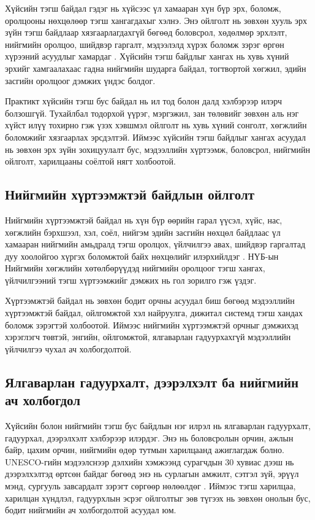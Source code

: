 Хүйсийн тэгш байдал гэдэг нь хүйсээс үл хамааран хүн бүр эрх, боломж, оролцооны нөхцөлөөр тэгш хангагдахыг хэлнэ. Энэ ойлголт нь зөвхөн хууль эрх зүйн тэгш байдлаар хязгаарлагдахгүй бөгөөд боловсрол, хөдөлмөр эрхлэлт, нийгмийн оролцоо, шийдвэр гаргалт, мэдээлэлд хүрэх боломж зэрэг өргөн хүрээний асуудлыг хамардаг \cite{gender_equality_general}. Хүйсийн тэгш байдлыг хангах нь хувь хүний эрхийг хамгаалахаас гадна нийгмийн шударга байдал, тогтвортой хөгжил, эдийн засгийн оролцоог дэмжих үндэс болдог.

Практикт хүйсийн тэгш бус байдал нь ил тод болон далд хэлбэрээр илэрч болзошгүй. Тухайлбал тодорхой үүрэг, мэргэжил, зан төлөвийг зөвхөн аль нэг хүйст илүү тохирно гэж үзэх хэвшмэл ойлголт нь хувь хүний сонголт, хөгжлийн боломжийг хязгаарлах эрсдэлтэй. Иймээс хүйсийн тэгш байдлыг хангах асуудал нь зөвхөн эрх зүйн зохицуулалт бус, мэдээллийн хүртээмж, боловсрол, нийгмийн ойлголт, харилцааны соёлтой нягт холбоотой.

\subsection{Нийгмийн хүртээмжтэй байдлын ойлголт}

Нийгмийн хүртээмжтэй байдал нь хүн бүр өөрийн гарал үүсэл, хүйс, нас, хөгжлийн бэрхшээл, хэл, соёл, нийгэм эдийн засгийн нөхцөл байдлаас үл хамааран нийгмийн амьдралд тэгш оролцох, үйлчилгээ авах, шийдвэр гаргалтад дуу хоолойгоо хүргэх боломжтой байх нөхцөлийг илэрхийлдэг \cite{social_inclusion_general}. НҮБ-ын Нийгмийн хөгжлийн хөтөлбөрүүдэд нийгмийн оролцоог тэгш хангах, үйлчилгээний тэгш хүртээмжийг дэмжих нь гол зорилго гэж үздэг.

Хүртээмжтэй байдал нь зөвхөн бодит орчны асуудал биш бөгөөд мэдээллийн хүртээмжтэй байдал, ойлгомжтой хэл найруулга, дижитал системд тэгш хандах боломж зэрэгтэй холбоотой. Иймээс нийгмийн хүртээмжтэй орчныг дэмжихэд хэрэглэгч төвтэй, энгийн, ойлгомжтой, ялгаварлан гадуурхахгүй мэдээллийн үйлчилгээ чухал ач холбогдолтой.

\subsection{Ялгаварлан гадуурхалт, дээрэлхэлт ба нийгмийн ач холбогдол}

Хүйсийн болон нийгмийн тэгш бус байдлын нэг илрэл нь ялгаварлан гадуурхалт, гадуурхал, дээрэлхэлт хэлбэрээр илэрдэг. Энэ нь боловсролын орчин, ажлын байр, цахим орчин, нийгмийн өдөр тутмын харилцаанд ажиглагдаж болно. UNESCO-гийн мэдээлснээр дэлхийн хэмжээнд сурагчдын 30 хувиас дээш нь дээрэлхэлтэд өртсөн байдаг бөгөөд энэ нь сурлагын амжилт, сэтгэл зүй, эрүүл мэнд, сургууль завсардалт зэрэгт сөргөөр нөлөөлдөг \cite{school_bullying_unesco}. Иймээс тэгш харилцаа, харилцан хүндлэл, гадуурхлын эсрэг ойлголтыг зөв түгээх нь зөвхөн онолын бус, бодит нийгмийн ач холбогдолтой асуудал юм.

